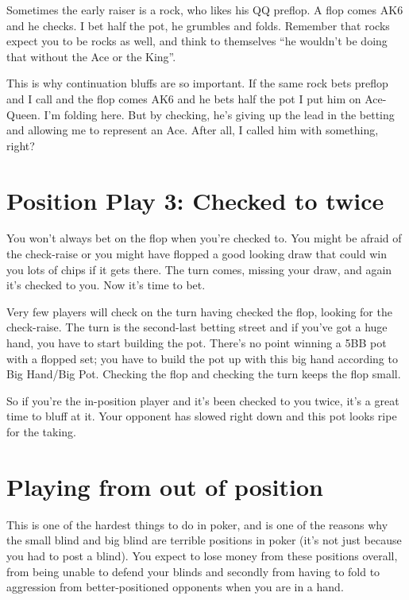Sometimes the early raiser is a rock, who likes his QQ preflop.
A flop comes AK6 and he checks. I bet half the pot, he grumbles and
folds. Remember that rocks expect you to be rocks as well, and think
to themselves ``he wouldn't be doing that without the Ace or the King''.

This is why continuation bluffs are so important. If the same rock bets
preflop and I call and the flop comes AK6 and he bets half the pot
I put him on Ace-Queen. I'm folding here. But by checking, he's giving
up the lead in the betting and allowing me to represent an Ace. After
all, I called him with something, right?

\section{Position Play 3: Checked to twice}

You won't always bet on the flop when you're checked to. You might
be afraid of the check-raise or you might have flopped a good looking
draw that could win you lots of chips if it gets there. The turn comes,
missing your draw, and again it's checked to you. Now it's time to bet.

Very few players will check on the turn having checked the flop,
looking for the check-raise. The turn is the second-last betting
street and if you've got a huge hand, you have to start building the pot.
There's no point winning a 5BB pot with a flopped set; you have to
build the pot up with this big hand according to Big Hand/Big Pot.
Checking the flop and checking the turn keeps the flop small.

So if you're the in-position player and it's been checked to you twice,
it's a great time to bluff at it. Your opponent has slowed right down
and this pot looks ripe for the taking.


\section{Playing from out of position}

This is one of the hardest things to do in poker, and is one of
the reasons why the small blind and big blind are
terrible positions in poker (it's not just because you had to post
a blind). You expect to lose money from these
positions overall, from being unable to defend your blinds and secondly
from having to fold to aggression from better-positioned opponents when you
are in a hand.

